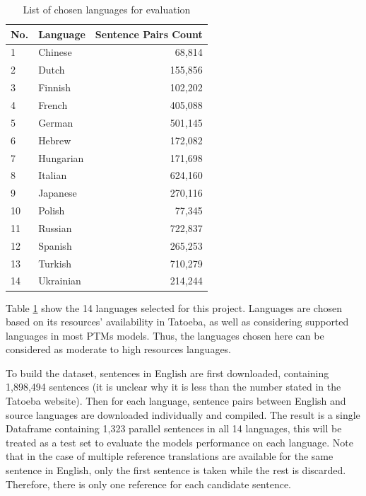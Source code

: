 \documentclass[a4paper]{article}
\begin{document}
\begin{table}[htbp]
    \centering
    \begin{tabular}{|l|l|r|}
        \hline
        \textbf{No.} & \textbf{Language} & \textbf{Sentence Pairs Count} \\
        \hline
        1            & Chinese           & 68,814                        \\
        2            & Dutch             & 155,856                       \\
        3            & Finnish           & 102,202                       \\
        4            & French            & 405,088                       \\
        5            & German            & 501,145                       \\
        6            & Hebrew            & 172,082                       \\
        7            & Hungarian         & 171,698                       \\
        8            & Italian           & 624,160                       \\
        9            & Japanese          & 270,116                       \\
        10           & Polish            & 77,345                        \\
        11           & Russian           & 722,837                       \\
        12           & Spanish           & 265,253                       \\
        13           & Turkish           & 710,279                       \\
        14           & Ukrainian         & 214,244                       \\
        \hline
    \end{tabular}
    \caption{List of chosen languages for evaluation}
    \label{table:eval_languages}
\end{table}

Table \ref{table:eval_languages} show the 14 languages selected for this project. Languages are chosen based on its resources' availability in Tatoeba, as well as considering supported languages in most PTMs models. Thus, the languages chosen here can be considered as moderate to high resources languages.

To build the dataset, sentences in English are first downloaded, containing 1,898,494 sentences (it is unclear why it is less than the number stated in the Tatoeba website). Then for each language, sentence pairs between English and source languages are downloaded individually and compiled. The result is a single Dataframe containing 1,323 parallel sentences in all 14 languages, this will be treated as a test set to evaluate the models performance on each language. Note that in the case of multiple reference translations are available for the same sentence in English, only the first sentence is taken while the rest is discarded. Therefore, there is only one reference for each candidate sentence.
\end{document}
